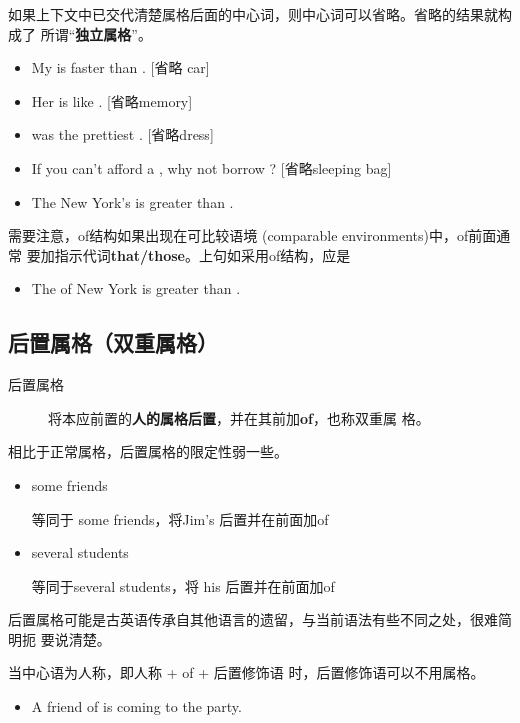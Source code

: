 如果上下文中已交代清楚属格后面的中心词，则中心词可以省略。省略的结果就构成了
所谓“\textbf{独立属格}”。
\begin{itemize}
\item  My  is faster than .  [省略 car]
\item  Her  is like . [省略memory]
\item {} was the prettiest . [省略dress]
\item If you can't afford a , why not borrow ? [省略sleeping bag]
\item The New York's  is greater than .
\end{itemize}

需要注意，of结构如果出现在可比较语境 (comparable environments)中，of前面通常
要加指示代词\textbf{that/those}。上句如采用of结构，应是
\begin{itemize}
\item The  of New York is greater than .
\end{itemize}

\subsection{后置属格（双重属格）}

\begin{description}
\item[后置属格] 将本应前置的\textbf{人的属格后置}，并在其前加\textbf{of}，也称双重属
  格。
\end{description}

相比于正常属格，后置属格的限定性弱一些。
\begin{itemize}
\item some friends 

  等同于 some  friends，将Jim's 后置并在前面加of

\item several students 

  等同于several  students，将 his 后置并在前面加of
\end{itemize}

后置属格可能是古英语传承自其他语言的遗留，与当前语法有些不同之处，很难简明扼
要说清楚。

当中心语为人称，即人称 + of + 后置修饰语 时，后置修饰语可以不用属格。
\begin{itemize}
\item A friend of  is coming to the party.
\end{itemize}


